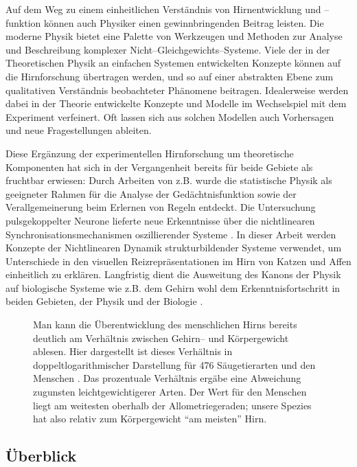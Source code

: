 Auf dem Weg zu einem einheitlichen Verständnis von Hirnentwicklung und
\mbox{--funktion} können auch Physiker einen gewinnbringenden Beitrag leisten.
Die moderne Physik bietet eine Palette von Werkzeugen und Methoden zur
Analyse und Beschreibung komplexer Nicht--Gleichgewichts--Systeme.  Viele
der in der Theoretischen Physik an einfachen Systemen entwickelten Konzepte
können auf die Hirnforschung übertragen werden, und so auf einer
abstrakten Ebene zum qualitativen Verständnis beobachteter Phänomene
beitragen. Idealerweise werden dabei in der Theorie entwickelte Konzepte
und Modelle im Wechselspiel mit dem Experiment verfeinert. Oft lassen sich
aus solchen Modellen auch Vorhersagen und neue Fragestellungen ableiten.

Diese Ergänzung der experimentellen Hirnforschung um theoretische
Komponenten hat sich in der Vergangenheit bereits für beide Gebiete als
fruchtbar erwiesen: Durch Arbeiten von \textcite{hopfield:1982}
z.B. wurde die statistische Physik als geeigneter Rahmen für die Analyse
der Gedächtnisfunktion sowie der Verallgemeinerung beim Erlernen von
Regeln entdeckt.  Die Untersuchung pulsgekoppelter Neurone lieferte neue
Erkenntnisse über die nichtlinearen Synchronisationsmechanismen
oszillierender Systeme \parencite[siehe z.B.][]{ernst95a}.  In dieser
Arbeit werden Konzepte der Nichtlinearen Dynamik strukturbildender Systeme
verwendet, um Unterschiede in den visuellen Reizrepräsentationen im Hirn
von Katzen und Affen einheitlich zu erklären.  Langfristig dient die
Ausweitung des Kanons der Physik auf biologische Systeme wie z.B. dem
Gehirn wohl dem Erkenntnisfortschritt in beiden Gebieten, der Physik und
der Biologie \parencite{braitenberg:1977}.

\begin{figure}[t]
\centering
{}
\caption{Man kann die Überentwicklung des menschlichen Hirns bereits
deutlich am Verhältnis zwischen Gehirn-- und Körpergewicht ablesen. Hier
dargestellt ist dieses Verhältnis in doppeltlogarithmischer Darstellung
für 476 Säugetierarten und den Menschen
\parencite[aus][]{martin:1995}. Das prozentuale Verhältnis ergäbe
eine Abweichung zugunsten leichtgewichtigerer Arten.  Der Wert für den
Menschen liegt am weitesten oberhalb der Allometriegeraden; unsere Spezies
hat also relativ zum Körpergewicht ``am meisten'' Hirn.}
\label{hirnmasse}
\end{figure}

\subsection{Überblick}


